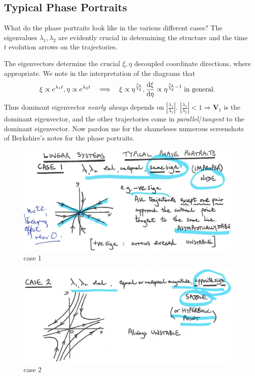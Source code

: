\documentclass[12pt]{report}
\theoremstyle{definition}
\begin{document}
\subsection{Typical Phase Portraits}

What do the phase portraits look like in the various different cases?
The eigenvalues $\lambda_1, \lambda_2$ are evidently crucial in determining the structure
and the time $t$ evolution arrows on the trajectories.

The eigenvectors determine the crucial $\xi, \eta$ decoupled coordinate directions,
where appropriate. We note in the interpretation of the diagrams that\[
    \xi \propto e^{\lambda_1 t},\eta \propto e^{\lambda_2 t}
\quad\Longrightarrow{}\quad\xi \propto \eta^{\frac{\lambda_1}{\lambda_2}},
\frac{\mathrm{d}\xi}{\mathrm{d}\eta} \propto \eta^{\frac{\lambda_1}{\lambda_2} - 1}
\;\textnormal{in general}.
\]
Thus dominant eigenvector \emph{nearly always} depends on 
$\left|\frac{\lambda_1}{\lambda_2}\right|$.
$\left|\frac{\lambda_1}{\lambda_2}\right| < 1 \Longrightarrow \mathbf{V}_1$
is the dominant eigenvector,
and the other trajectories come in \emph{parallel}/\emph{tangent} to the dominant eigenvector.  
Now pardon me for the shameleses numerous screenshots of Berkshire's notes for the phase portraits.

\begin{figure}
  	\includegraphics[scale=0.15]{PP1.jpeg}
  	\centering
  	\caption{case 1}\label{PP1}
\end{figure}

\begin{figure}
  	\includegraphics[scale=0.15]{PP2.jpeg}
  	\centering
  	\caption{case 2}\label{PP2}
\end{figure}
\end{document}
